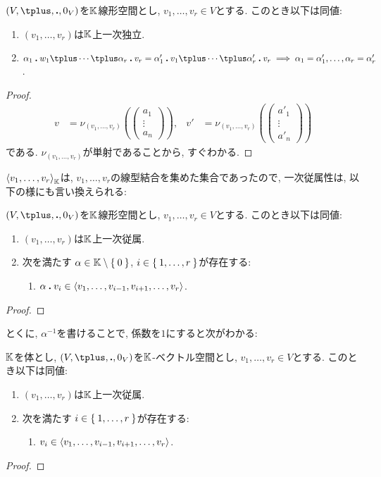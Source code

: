 \begin{prop}
  $(V,\plus,\act,0_V)$を$\mathbb{K}$線形空間とし,
  $v_1,\ldots,v_r\in V$とする.
  このとき以下は同値:
  \begin{enumerate}
  \item $(v_1,\ldots,v_r)$は$\mathbb{K}$上一次独立.
  \item $\alpha_1\act w_1\plus\cdots\plus \alpha_r\act v_r=\alpha'_1\act v_1\plus\cdots\plus \alpha'_r\act v_r \implies \alpha_1=\alpha'_1,\ldots,\alpha_r=\alpha'_r$.
  \end{enumerate}
\end{prop}
\begin{proof}
\begin{align*}
v&=\nu_{(v_1,\ldots,v_r)}(\begin{pmatrix}a_1\\\vdots\\a_n\end{pmatrix}), &
v'&=\nu_{(v_1,\ldots,v_r)}(\begin{pmatrix}a'_1\\\vdots\\a'_n\end{pmatrix}) 
\end{align*}
である. $\nu_{(v_1,\ldots,v_r)}$が単射であることから, すぐわかる.
\end{proof}

$\Braket{v_1,\ldots,v_r}_{\mathbb{K}}$は,
$v_1,\ldots,v_r$の線型結合を集めた集合であったので,
一次従属性は, 以下の様にも言い換えられる:
\begin{lemma}
  $(V,\plus,\act,0_V)$を$\mathbb{K}$線形空間とし,
  $v_1,\ldots,v_r\in V$とする.
  このとき以下は同値:
  \begin{enumerate}
  \item $(v_1,\ldots,v_r)$は$\mathbb{K}$上一次従属.
  \item
  次を満たす
  $\alpha\in\mathbb{K}\setminus\Set{0}$, $i\in\Set{1,\ldots,r}$が存在する:
  \begin{enumerate}
  \item $\alpha\mathbin{\boldsymbol{.}} v_i \in \Braket{v_1,\ldots,v_{i-1},v_{i+1},\ldots,v_{r}}$.
  \end{enumerate}
  \end{enumerate}
\end{lemma}
\begin{proof}\end{proof}
とくに, $\alpha^{-1}$を書けることで,
係数を$1$にすると次がわかる:
\begin{prop}
 $\mathbb{K}$を体とし,
  $(V,\plus,\act,0_V)$を$\mathbb{K}$-ベクトル空間とし,
  $v_1,\ldots,v_r\in V$とする.
  このとき以下は同値:
  \begin{enumerate}
  \item $(v_1,\ldots,v_r)$は$\mathbb{K}$上一次従属.
  \item
  次を満たす
  $i\in\Set{1,\ldots,r}$が存在する:
  \begin{enumerate}
  \item $v_i \in \Braket{v_1,\ldots,v_{i-1},v_{i+1},\ldots,v_{r}}$.
  \end{enumerate}
  \end{enumerate}
\end{prop}
\begin{proof}\end{proof}

